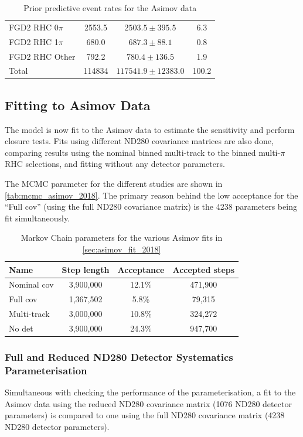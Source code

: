 \begin{table}
\begin{tabular} {l | c c | c}
		\hline
		FGD2 \numu RHC 0$\pi$   & 2553.5   & $2503.5\pm395.5$   & 6.3  \\
		FGD2 \numu RHC 1$\pi$   & 680.0    & $687.3\pm88.1$     & 0.8  \\
		FGD2 \numu RHC Other    & 792.2   	& $780.4\pm136.5$     & 1.9  \\
		\hline
		Total                   & 114834    & $117541.9\pm12383.0$  & 100.2 \\
		\hline
		\hline
	\end{tabular}
	\caption{Prior predictive event rates for the Asimov data}
	\label{tab:asimov_prior_pred_2018}
\end{table}

\subsection{Fitting to Asimov Data}
\label{sec:asimov_fit_2018}
The model is now fit to the Asimov data to estimate the sensitivity and perform closure tests. Fits using different ND280 covariance matrices are also done, comparing results using the nominal binned multi-track to the binned multi-$\pi$ RHC selections, and fitting without any detector parameters.

The MCMC parameter for the different studies are shown in \autoref{tab:mcmc_asimov_2018}. The primary reason behind the low acceptance for the ``Full cov'' (using the full ND280 covariance matrix) is the 4238 parameters being fit simultaneously.
\begin{table}[h]
	\begin{tabular}{l | c c c}
		\hline
		\hline
		Name		&	Step length & Acceptance & Accepted steps \\
		\hline
		Nominal cov	& 	3,900,000	& 12.1\%	 & 471,900 \\
		Full cov	& 	1,367,502	& 5.8\%		 & 79,315 \\
		Multi-track & 	3,000,000	& 10.8\%	 & 324,272 \\
		No det		& 	3,900,000	& 24.3\%	 & 947,700 \\
		\hline
		\hline
	\end{tabular}
	\caption{Markov Chain parameters for the various Asimov fits in \autoref{sec:asimov_fit_2018}}
	\label{tab:mcmc_asimov_2018}
\end{table}

\subsubsection{Full and Reduced ND280 Detector Systematics Parameterisation}
Simultaneous with checking the performance of the parameterisation, a fit to the Asimov data using the reduced ND280 covariance matrix (1076 ND280 detector parameters) is compared to one using the full ND280 covariance matrix (4238 ND280 detector parameters).

